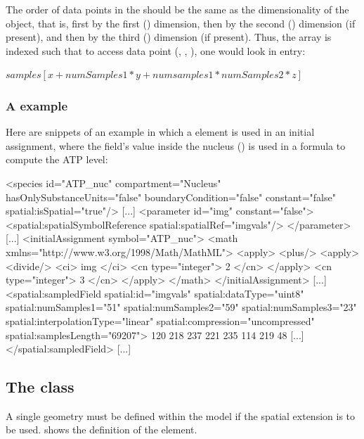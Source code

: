 The order of data points in the  should be the same as the dimensionality of the object, that is, first by the first () dimension, then by the second () dimension (if present), and then by the third () dimension (if present).  Thus, the array is indexed such that to access data point (, , ), one would look in entry:

$samples[x + numSamples1*y + numsamples1*numSamples2*z]$

\subsubsection{A \SampledField example}
Here are snippets of an example in which a \SampledField element is used in an initial assignment, where the field's value inside the nucleus () is used in a formula to compute the ATP level:

\begin{example}
[...]
  <species id="ATP_nuc" compartment="Nucleus" hasOnlySubstanceUnits="false"
           boundaryCondition="false" constant="false" spatial:isSpatial="true"/>
[...]
  <parameter id="img" constant="false">
    <spatial:spatialSymbolReference spatial:spatialRef="imgvals"/>
  </parameter>
[...]
  <initialAssignment symbol="ATP_nuc">
    <math xmlns="http://www.w3.org/1998/Math/MathML">
      <apply>
        <plus/>
        <apply>
          <divide/>
          <ci> img </ci>
          <cn type="integer"> 2 </cn>
        </apply>
        <cn type="integer"> 3 </cn>
      </apply>
    </math>
  </initialAssignment>
[...]
  <spatial:sampledField spatial:id="imgvals" spatial:dataType="uint8"
           spatial:numSamples1="51" spatial:numSamples2="59"
           spatial:numSamples3="23" spatial:interpolationType="linear"
           spatial:compression="uncompressed" spatial:samplesLength="69207">
    120 218 237 221 235 114 219 48 [...]
  </spatial:sampledField>
[...]
\end{example}


\subsection{The  class}
\label{geometry-class}
\label{listofcoordinatecomponents-class}
\label{listofdomaintypes-class}
\label{listofdomains-class}
\label{listofadjacentdomains-class}
\label{listofgeometrydefinitions-class}
\label{listofsampledfields-class}

A single geometry must be defined within the model if the spatial extension is to be used.  shows the definition of the \Geometry element.
 
